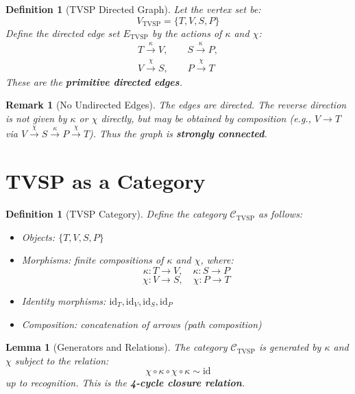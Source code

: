 \documentclass[12pt]{article}
\newtheorem{definition}[axiom]{Definition}
\newtheorem{lemma}[axiom]{Lemma}
\newtheorem{remark}[axiom]{Remark}
\begin{document}
\begin{definition}[TVSP Directed Graph]
Let the vertex set be:
\[
V_{\text{TVSP}} = \{T, V, S, P\}
\]
Define the directed edge set \(E_{\text{TVSP}}\) by the actions of \(\kappa\) and \(\chi\):
\[
\begin{array}{c}
T \xrightarrow{\kappa} V, \qquad
S \xrightarrow{\kappa} P, \\[4pt]
V \xrightarrow{\chi} S, \qquad
P \xrightarrow{\chi} T
\end{array}
\]
These are the \textbf{primitive directed edges}.
\end{definition}

\begin{remark}[No Undirected Edges]
The edges are directed. The reverse direction is not given by \(\kappa\) or \(\chi\) directly, but may be obtained by composition (e.g., \(V \to T\) via \(V \xrightarrow{\chi} S \xrightarrow{\kappa} P \xrightarrow{\chi} T\)).
Thus the graph is \textbf{strongly connected}.
\end{remark}

\section{TVSP as a Category}

\begin{definition}[TVSP Category]
Define the category \(\mathcal{C}_{\text{TVSP}}\) as follows:
\begin{itemize}
    \item Objects: \(\{T, V, S, P\}\)
    \item Morphisms: finite compositions of \(\kappa\) and \(\chi\), where:
    \[
    \kappa: T \to V,\quad \kappa: S \to P
    \]
    \[
    \chi: V \to S,\quad \chi: P \to T
    \]
    \item Identity morphisms: \(\text{id}_T, \text{id}_V, \text{id}_S, \text{id}_P\)
    \item Composition: concatenation of arrows (path composition)
\end{itemize}
\end{definition}

\begin{lemma}[Generators and Relations]
The category \(\mathcal{C}_{\text{TVSP}}\) is generated by \(\kappa\) and \(\chi\) subject to the relation:
\[
\chi \circ \kappa \circ \chi \circ \kappa \sim \text{id}
\]
up to recognition. This is the \textbf{4-cycle closure relation}.
\end{lemma}
\end{document}
